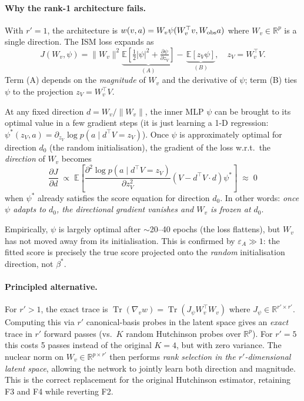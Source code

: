 \documentclass[11pt]{article}
\newcommand{\R}{\mathbb{R}}
\newcommand{\E}{\mathbb{E}}
\begin{document}
\paragraph{Why the rank-1 architecture fails.}
With $r'=1$, the architecture is $w(v,a)=W_v\psi(W_v^\top v, W_{\rm obs} a)$
where $W_v\in\R^p$ is a single direction.  The ISM loss expands as
\[
J(W_v,\psi) = \|W_v\|^2
  \underbrace{\E\!\left[\tfrac12|\psi|^2+\tfrac{\partial\psi}{\partial z_V}\right]}_{(A)}
  -\,\underbrace{\E[z_V\psi]}_{(B)},
  \quad z_V=W_v^\top V.
\]
Term (A) depends on the \emph{magnitude} of $W_v$ and the derivative of $\psi$;
term (B) ties $\psi$ to the projection $z_V = W_v^\top V$.

At any fixed direction $d=W_v/\|W_v\|$, the inner MLP $\psi$ can be brought to
its optimal value in a few gradient steps (it is just learning a 1-D regression:
$\psi^*(z_V,a)=\partial_{z_V}\log p(a\mid d^\top V=z_V)$).
Once $\psi$ is approximately optimal for direction $d_0$ (the random
initialisation), the gradient of the loss w.r.t.\ the \emph{direction} of $W_v$
becomes
\[
\frac{\partial J}{\partial d}
\;\propto\;
\E\!\left[
  \frac{\partial^2\log p(a\mid d^\top V=z_V)}{\partial z_V^2}
  (V - d^\top V\cdot d)
  \psi^*
\right]
\;\approx\;0
\]
when $\psi^*$ already satisfies the score equation for direction $d_0$.
In other words: \emph{once $\psi$ adapts to $d_0$, the directional gradient
vanishes and $W_v$ is frozen at $d_0$}.

Empirically, $\psi$ is largely optimal after $\sim$20--40 epochs (the loss
flattens), but $W_v$ has not moved away from its initialisation.
This is confirmed by $\varepsilon_A\gg1$: the fitted score is precisely the true
score projected onto the \emph{random} initialisation direction, not $\beta^*$.

\paragraph{Principled alternative.}
For $r'>1$, the exact trace is
$\operatorname{Tr}(\nabla_v w) = \operatorname{Tr}(J_\psi W_v^\top W_v)$
where $J_\psi\in\R^{r'\times r'}$.  Computing this via $r'$ canonical-basis
probes in the latent space gives an \emph{exact} trace in $r'$ forward passes
(vs.\ $K$ random Hutchinson probes over $\R^p$).
For $r'=5$ this costs 5 passes instead of the original $K=4$, but with zero
variance.  The nuclear norm on $W_v\in\R^{p\times r'}$ then performs
\emph{rank selection in the $r'$-dimensional latent space}, allowing the network
to jointly learn both direction and magnitude.
This is the correct replacement for the original Hutchinson estimator, retaining
F3 and F4 while reverting F2.
\end{document}
